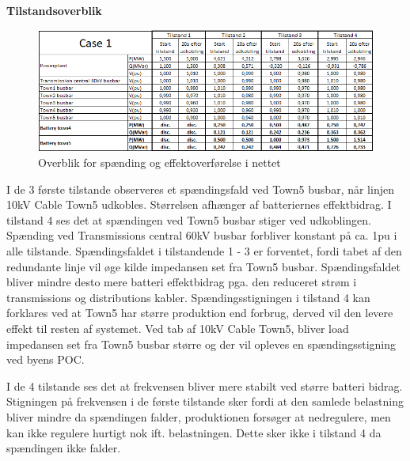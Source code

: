 \textbf{Tilstandsoverblik}
\begin{figure}[H] %
	\centering
	\includegraphics[width=1\textwidth]{figurer/SmallDisturbance/Overview}
	\caption{Overblik for spænding og effektoverførelse i nettet}
	\label{fig:C1Overview}
\end{figure}


I de 3 første tilstande observeres et spændingsfald ved Town5 busbar, når linjen 10kV Cable Town5 udkobles. Størrelsen afhænger af batteriernes effektbidrag. I tilstand 4 ses det at spændingen ved Town5 busbar stiger ved udkoblingen. Spænding ved Transmissions central 60kV busbar forbliver konstant på ca. 1pu i alle tilstande. Spændingsfaldet i tilstandende 1 - 3 er forventet, fordi tabet af den redundante linje vil øge kilde impedansen set fra Town5 busbar. Spændingsfaldet bliver mindre desto mere batteri effektbidrag pga. den reduceret strøm i transmissions og distributions kabler. Spændingsstigningen i tilstand 4 kan forklares ved at Town5 har større produktion end forbrug, derved vil den levere effekt til resten af systemet. Ved tab af 10kV Cable Town5, bliver load impedansen set fra Town5 busbar større og der vil opleves en spændingsstigning ved byens POC.

I de 4 tilstande ses det at frekvensen bliver mere stabilt ved større batteri bidrag. Stigningen på frekvensen i de første tilstande sker fordi at den samlede belastning bliver mindre da spændingen falder, produktionen forsøger at nedregulere, men kan ikke regulere hurtigt nok ift. belastningen. Dette sker ikke i tilstand 4 da spændingen ikke falder.   
